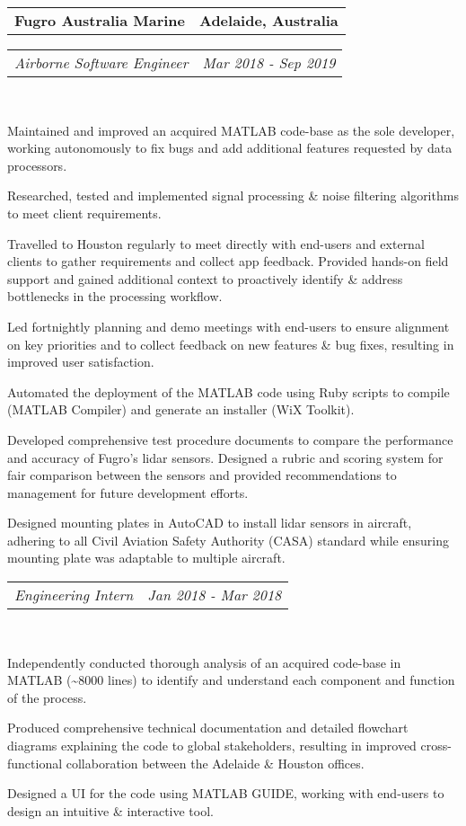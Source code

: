 \documentclass[10pt,letterpaper]{article}
\makeatletter
\newcommand{\headerrow}[2]
{\begin{tabular*}{\linewidth}{l@{\extracolsep{\fill}}r}
	#1 &
	#2 \\
\end{tabular*}}
\makeatother
\begin{document}
    \headerrow
    {\textbf{Fugro Australia Marine}}
    {\textbf{Adelaide, Australia}}

	\headerrow
		{\emph{Airborne Software Engineer}}
		{\emph{Mar 2018 - Sep 2019}} \\
    \begin{itemize*}
    \vspace{-0.5em}
\item Maintained and improved an acquired MATLAB code-base as the sole developer, working autonomously to fix bugs and add additional features requested by data processors.
\item Researched, tested and implemented signal processing \& noise filtering algorithms to meet client requirements. 
\item Travelled to Houston regularly to meet directly with end-users and external clients to gather requirements and collect app feedback. Provided hands-on field support and gained additional context to proactively identify \& address bottlenecks in the processing workflow.
\item Led fortnightly planning and demo meetings with end-users to ensure alignment on key priorities and to collect feedback on new features \& bug fixes, resulting in improved user satisfaction.
\item Automated the deployment of the MATLAB code using Ruby scripts to compile (MATLAB Compiler) and generate an installer (WiX Toolkit).
\item Developed comprehensive test procedure documents to compare the performance and accuracy of Fugro’s lidar sensors. Designed a rubric and scoring system for fair comparison between the sensors and provided recommendations to management for future development efforts.
\item Designed mounting plates in AutoCAD to install lidar sensors in aircraft, adhering to all Civil Aviation Safety Authority (CASA) standard while ensuring mounting plate was adaptable to multiple aircraft.
    \end{itemize*}

\newpage
\vspace{.5em}
\headerrow
{\emph{Engineering Intern}}
{\emph{Jan 2018 - Mar 2018}} \\
 \begin{itemize*}
\vspace{-0.5em}
\item Independently conducted thorough analysis of an acquired code-base in MATLAB (\textasciitilde 8000 lines) to identify and understand each component and function of the process.  
\item Produced comprehensive technical documentation and detailed flowchart diagrams explaining the code to global stakeholders, resulting in improved cross-functional collaboration between the Adelaide \& Houston offices. 
\item Designed a UI for the code using MATLAB GUIDE, working with end-users to design an intuitive \& interactive tool.

\end{itemize*}    
\end{document}

